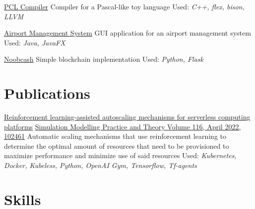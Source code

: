 \documentclass[11pt,a4paper,sans]{moderncv} %
\begin{document}
\cventry{}
{\href{https://github.com/Nickgraviton/pcl-compiler}{PCL Compiler}}
{\newline Compiler for a Pascal-like toy language}
{\newline Used: \emph{C++, flex, bison, LLVM}}{}{}

\cventry{}
{\href{https://github.com/Nickgraviton/airport-management-system}{Airport Management System}}
{\newline GUI application for an airport management system}
{\newline Used: \emph{Java, JavaFX}}{}{}

\cventry{}
{\href{https://github.com/Nickgraviton/noobcash}{Noobcash}}
{\newline Simple blockchain implementation}
{\newline Used: \emph{Python, Flask}}{}{}


\section{Publications}

{\href{https://gitlab.com/netmode/k8s-rl-autoscaler}{Reinforcement learning-assisted autoscaling mechanisms for serverless computing platforms}}
{\href{https://doi.org/10.1016/j.simpat.2021.102461}{Simulation Modelling Practice and Theory Volume 116, April 2022, 102461}}
{\newline Automatic scaling mechanisms that use reinforcement learning to determine the optimal amount of resources that need to be provisioned to maximize performance and minimize use of said resources}
{\newline Used: \emph{Kubernetes, Docker, Kubeless, Python, OpenAI Gym, Tensorflow, Tf-agents}}{}


\section{Skills}

\end{document}
